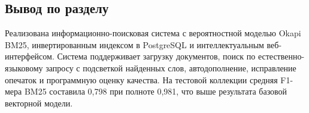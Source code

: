 \subsection{Вывод по разделу}

Реализована информационно-поисковая система с вероятностной моделью Okapi BM25, инвертированным индексом в PostgreSQL и интеллектуальным веб-интерфейсом. Система поддерживает загрузку документов, поиск по естественно-языковому запросу с подсветкой найденных слов, автодополнение, исправление опечаток и программную оценку качества. На тестовой коллекции средняя F1-мера BM25 составила 0,798 при полноте 0,981, что выше результата базовой векторной модели.
